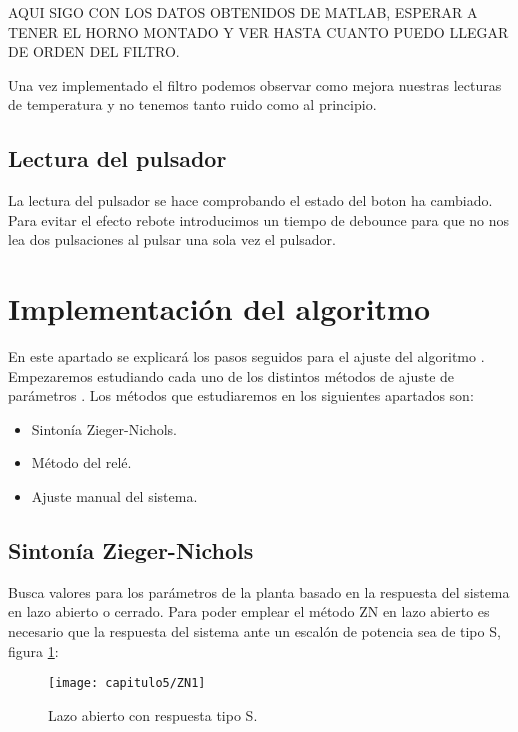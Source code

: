 AQUI SIGO CON LOS DATOS OBTENIDOS DE MATLAB, ESPERAR A TENER EL HORNO MONTADO Y VER HASTA CUANTO PUEDO LLEGAR DE ORDEN DEL FILTRO.

Una vez implementado el filtro  podemos observar como mejora nuestras lecturas de temperatura y no tenemos tanto ruido como al principio.






\subsection{Lectura del pulsador}
La lectura del pulsador se hace comprobando el estado del boton ha cambiado. Para evitar el efecto rebote introducimos un tiempo de debounce para que no nos lea dos pulsaciones al pulsar una sola vez el pulsador. 

\section{Implementación del algoritmo }
En este apartado se explicará los pasos seguidos para el ajuste del algoritmo . Empezaremos estudiando cada uno de los distintos métodos de ajuste de parámetros .
Los métodos que estudiaremos en los siguientes apartados son:

\begin{itemize}
\item Sintonía Zieger-Nichols. \cite{Ibrahim}
\item Método del relé. \cite{wilson}
\item Ajuste manual del sistema.\cite{Skogestad}
\end{itemize}

\subsection{Sintonía Zieger-Nichols}
Busca valores para los parámetros  de la planta basado en la respuesta del sistema en
lazo abierto o cerrado. Para poder emplear el método ZN en lazo abierto es necesario que la
respuesta del sistema ante un escalón de potencia sea de tipo S, figura \ref{fig:ZN1}:

\smallskip
\begin{figure}[H]%
\noindent \begin{centering}
\texttt{[image: capitulo5/ZN1]}
\par\end{centering}
\caption{\label{fig:ZN1} Lazo abierto con respuesta tipo S\cite{Ibrahim}.}
\end{figure}
\smallskip

